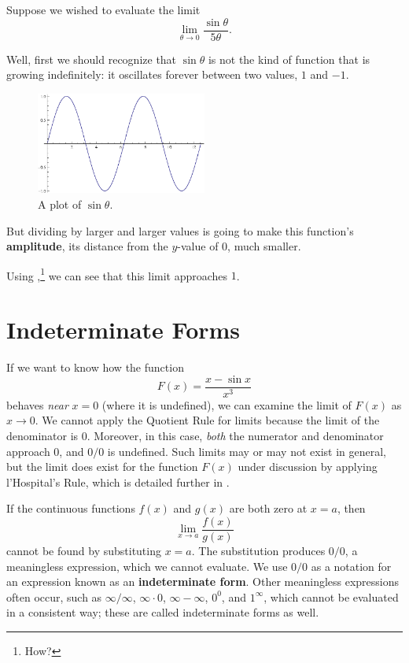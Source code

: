 \begin{ex}
  Suppose we wished to evaluate the limit
  \[  \lim_{\theta \to 0} \frac{\sin \theta}{5 \theta}. \]
  \begin{sol}
    Well, first we should recognize that $\sin \theta$ is not the kind of function that is growing indefinitely:
    it oscillates forever between two values, $1$ and $-1$.
    \begin{figure}[H]
      \begin{center}
        \includegraphics[width=0.5\textwidth]{continuous/limits/sintheta}
      \end{center}
      \caption{A plot of $\sin \theta$.}
      \label{fig:sintheta}
    \end{figure}
  \end{sol}
  But dividing by larger and larger values is going to make this function's \textbf{amplitude},
  its distance from the $y$-value of $0$, much smaller.

  Using ,\footnote{How?} we can see that this limit approaches $1$.
\end{ex}

\section{Indeterminate Forms}
If we want to know how the function
\begin{equation}
    F(x)=\frac{x-\sin x}{x^3}
    \label{eq:indeterminate_form}
\end{equation}
behaves \emph{near} $x=0$ (where it is undefined), we can examine the limit of $F(x)$ as $x \to 0$. We cannot apply the Quotient Rule for limits because the limit of the denominator is $0$. Moreover, in this case, \emph{both} the numerator and denominator approach $0$, and $0/0$ is undefined. Such limits may or may not exist in general, but the limit does exist for the function $F(x)$ under discussion by applying l'Hospital's Rule, which is detailed further in .

If the continuous functions $f(x)$ and $g(x)$ are both zero at $x=a$, then
\[\lim_{x \to a} \frac{f(x)}{g(x)}\]
cannot be found by substituting $x=a$. The substitution produces $0/0$, a meaningless expression, which we cannot evaluate. We use $0/0$ as a notation for an expression known as an \textbf{indeterminate form}. Other meaningless expressions often occur, such as $\infty / \infty$, $\infty \cdot 0$, $\infty - \infty$, $0^0$, and $1^{\infty}$, which cannot be evaluated in a consistent way; these are called indeterminate forms as well.

